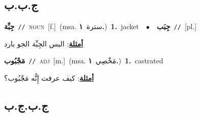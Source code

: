 \documentclass[10pt,a4paper,twoside]{article} %
\begin{document}
\begin{multicols}{2}
\vspace{-3mm}
\subsection*{\color{blue}\foreignlanguage{arabic}{ج.ب.ب}\color{blue}{}} 

{\setlength\topsep{0pt}\textbf{\foreignlanguage{arabic}{جِبِّة}}\ {\color{gray}\texttt{//}\color{black}}\ \textsc{noun}\ [f.]\ \color{gray}(msa. \foreignlanguage{arabic}{سترة}~\foreignlanguage{arabic}{\textbf{١.}})\color{black}\ \textbf{1.}~jacket\ \ $\bullet$\ \ \setlength\topsep{0pt}\textbf{\foreignlanguage{arabic}{جِبَب}}\ {\color{gray}\texttt{//}\color{black}}\ [pl.]\  \begin{flushright}\color{gray}\foreignlanguage{arabic}{\textbf{\underline{\foreignlanguage{arabic}{أمثلة}}}: البس الجِبِّة الجو بارد}\end{flushright}\color{black}} \vspace{2mm}

{\setlength\topsep{0pt}\textbf{\foreignlanguage{arabic}{مَجْبُوب}}\ {\color{gray}\texttt{//}\color{black}}\ \textsc{adj}\ [m.]\ \color{gray}(msa. \foreignlanguage{arabic}{مَخْصِي}~\foreignlanguage{arabic}{\textbf{١.}})\color{black}\ \textbf{1.}~castrated\  \begin{flushright}\color{gray}\foreignlanguage{arabic}{\textbf{\underline{\foreignlanguage{arabic}{أمثلة}}}: كيف عرفت إِنُّه مَجْبُوب؟}\end{flushright}\color{black}} \vspace{2mm}

\vspace{-3mm}
\subsection*{\color{blue}\foreignlanguage{arabic}{ج.ب.ج.ب}\color{blue}{}} 


\end{multicols}
\end{document}
